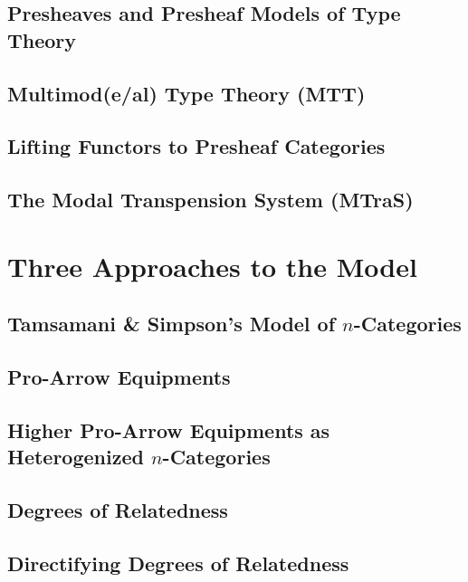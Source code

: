 \documentclass{lmcs} %
\theoremstyle{plain}\newtheorem{satz}[thm]{Satz} %
\theoremstyle{plain}
\theoremstyle{definition}
\begin{document}
\subsection{Presheaves and Presheaf Models of Type Theory} \label{sec:pshmodel}

\subsection{Multimod(e/al) Type Theory (MTT)}

\subsection{Lifting Functors to Presheaf Categories}

\subsection{The Modal Transpension System (MTraS)}

\section{Three Approaches to the Model}

\subsection{Tamsamani \& Simpson's Model of $n$-Categories}

\subsection{Pro-Arrow Equipments}

\subsection{Higher Pro-Arrow Equipments as Heterogenized $n$-Categories}

\subsection{Degrees of Relatedness}

\subsection{Directifying Degrees of Relatedness}
\end{document}
